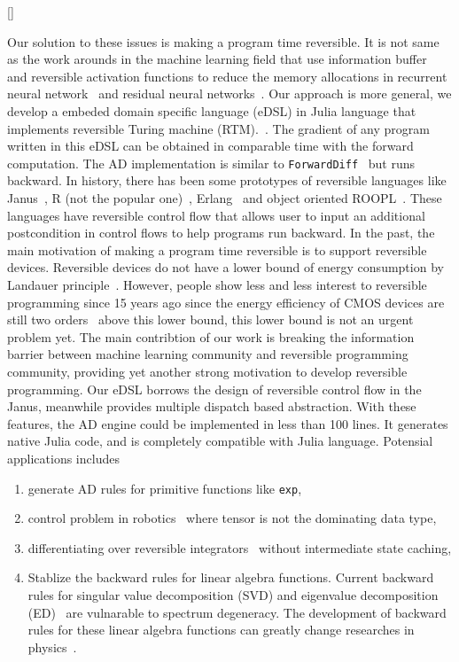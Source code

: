\documentclass[aps,twocolumn,longbibliography,english,superscriptaddress]{revtex4-1}
\newcommand{\<}{\langle}
\renewcommand{\>}{\rangle}
\newcommand{\blue}[1]{[{\bf  \color{blue}{JG: #1}}]}
\theoremstyle{definition}\newtheorem{definition}{\textit{Definition}}
\begin{document}
\blue{Grammarly here!}

Our solution to these issues is making a program time reversible. It is not same as the work arounds in the machine learning field that use information buffer~\cite{Maclaurin2015} and reversible activation functions to reduce the memory allocations in recurrent neural network~\cite{MacKay2018} and residual neural networks~\cite{Behrmann2018}. Our approach is more general, we develop a embeded domain specific language (eDSL) in Julia language that implements reversible Turing machine (RTM).~\cite{Perumalla2013,Frank2017}.
The gradient of any program written in this eDSL can be obtained in comparable time with the forward computation. The AD implementation is similar to \texttt{ForwardDiff}~\cite{Revels2016} but runs backward.
    In history, there has been some prototypes of reversible languages like Janus~\cite{Lutz1986}, R (not the popular one)~\cite{Frank1997}, Erlang~\cite{Lanese2018} and object oriented ROOPL~\cite{Haulund2017}. These languages have reversible control flow that allows user to input an additional postcondition in control flows to help programs run backward.
    In the past, the main motivation of making a program time reversible is to support reversible devices. Reversible devices do not have a lower bound of energy consumption by Landauer principle~\cite{Landauer1961}. However, people show less and less interest to reversible programming since 15 years ago since the energy efficiency of CMOS devices are still two orders~\cite{Frank2017} above this lower bound, this lower bound is not an urgent problem yet.
    The main contribtion of our work is breaking the information barrier between machine learning community and reversible programming community, providing yet another strong motivation to develop reversible programming.
    Our eDSL borrows the design of reversible control flow in the Janus, meanwhile provides multiple dispatch based abstraction. With these features, the AD engine could be implemented in less than 100 lines. It generates native Julia code, and is completely compatible with Julia language.
Potensial applications includes
\begin{enumerate}
    \item generate AD rules for primitive functions like \texttt{exp},
    \item control problem in robotics~\cite{Giftthaler2017} where tensor is not the dominating data type,
    \item differentiating over reversible integrators~\cite{Laikov2018} without intermediate state caching,
    \item Stablize the backward rules for linear algebra functions. Current backward rules for singular value decomposition (SVD) and eigenvalue decomposition (ED)~\cite{Seeger2017,Wan2019,Hubig2019} are vulnarable to spectrum degeneracy. The development of backward rules for these linear algebra functions can greatly change researches in physics~\cite{Xie2020,Liao2019}.

\end{enumerate}
\end{document}

